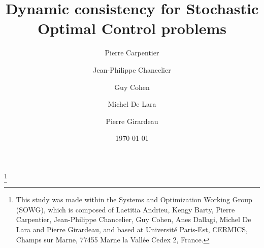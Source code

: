 \documentclass[a4paper]{amsart}
\theoremstyle{plain}
\theoremstyle{definition}
\theoremstyle{remark}
\begin{document}
\title{Dynamic consistency for Stochastic Optimal Control problems}

\author[P. Carpentier]{Pierre Carpentier}
\address{P. Carpentier, ENSTA ParisTech,
         32, boulevard Victor, 75739 Paris Cedex 15, Fran\-ce.}

\author[J.-Ph. Chancelier]{Jean-Philippe Chancelier}
\address{J.-Ph. Chancelier, Universit\'{e} Paris-Est, CERMICS, \'{E}cole des Ponts ParisTech,
         6 \& 8 avenue Blaise Pascal, 77455 Marne-la-Vall\'{e}e Cedex 2.}

\author[G. Cohen]{Guy Cohen}
\address{G. Cohen, Universit\'{e} Paris-Est, CERMICS, \'{E}cole des Ponts ParisTech,
         6 \& 8 avenue Blaise Pascal, 77455 Marne-la-Vall\'{e}e Cedex 2.}

\author[M. De Lara]{Michel De Lara}
\address{M. De Lara, Universit\'{e} Paris-Est, CERMICS, \'{E}cole des Ponts ParisTech,
         6 \& 8 avenue Blaise Pascal, 77455 Marne-la-Vall\'{e}e Cedex 2.}

\author[P. Girardeau]{Pierre Girardeau}
\address{P. Girardeau, EDF R\&D, 1, avenue du G\'{e}n\'{e}ral de Gaulle,
         F-92141 Clamart Cedex, France,
         also with Universit\'{e} Paris-Est, CERMICS and ENSTA.}

\thanks{This study was made within the Systems and Optimization Working
Group (SOWG), which is composed of Laetitia Andrieu, Kengy Barty,
Pierre Carpentier, Jean-Philippe Chancelier, Guy Cohen, Anes
Dallagi, Michel De Lara and Pierre Girardeau, and based at
Universit\'{e} Paris-Est, CERMICS, Champs sur Marne, 77455 Marne la
Vall\'{e}e Cedex 2, France.}

\date{\today}

\end{document}
